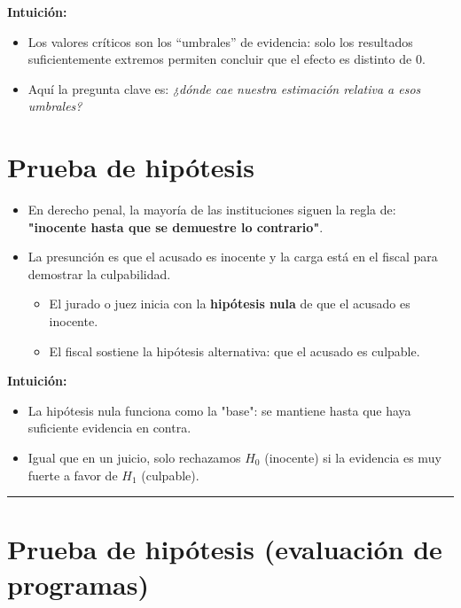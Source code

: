 \documentclass[12pt]{article}
\begin{document}
\textbf{Intuición:}
\begin{itemize}
    \item Los valores críticos son los “umbrales” de evidencia: solo los resultados suficientemente extremos permiten concluir que el efecto es distinto de 0.  
    \item Aquí la pregunta clave es: \textit{¿dónde cae nuestra estimación relativa a esos umbrales?}  
\end{itemize}

\section*{\noindent\textbf{Prueba de hipótesis}}

\begin{itemize}
    \item En derecho penal, la mayoría de las instituciones siguen la regla de: \textbf{"inocente hasta que se demuestre lo contrario"}.
    \item La presunción es que el acusado es inocente y la carga está en el fiscal para demostrar la culpabilidad.
    \begin{itemize}
        \item El jurado o juez inicia con la \textbf{hipótesis nula} de que el acusado es inocente.
        \item El fiscal sostiene la hipótesis alternativa: que el acusado es culpable.
    \end{itemize}
\end{itemize}

\textbf{Intuición:}
\begin{itemize}
    \item La hipótesis nula funciona como la "base": se mantiene hasta que haya suficiente evidencia en contra.  
    \item Igual que en un juicio, solo rechazamos $H_0$ (inocente) si la evidencia es muy fuerte a favor de $H_1$ (culpable).  
\end{itemize}

\hrule

\section*{\noindent\textbf{Prueba de hipótesis (evaluación de programas)}}
\end{document}
